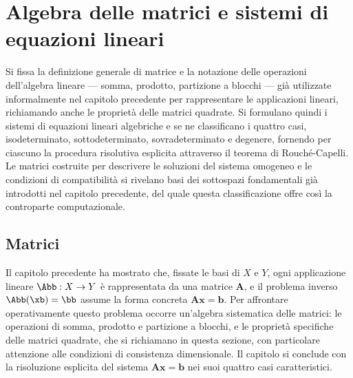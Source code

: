 \graphicspath{{Parti/P01-Preliminari/A02-Algebra_Matrici_Sistemi_Lineari/Figure/}}
\chapter{Algebra delle matrici e  sistemi di equazioni lineari}\label{app:algebra_eqlineari}

\begin{sommario}
	Si fissa la definizione generale di matrice e la notazione delle
	operazioni dell'algebra lineare --- somma, prodotto, partizione a
	blocchi --- gi\`a utilizzate informalmente nel capitolo precedente
	per rappresentare le applicazioni lineari, richiamando anche le
	propriet\`a delle matrici quadrate. Si formulano quindi i sistemi
	di equazioni lineari algebriche  e se ne
	classificano i quattro casi, isodeterminato, sottodeterminato,
	sovradeterminato e degenere, fornendo per ciascuno la procedura
	risolutiva esplicita attraverso il teorema di Rouch\'e-Capelli. Le
	matrici costruite per descrivere le soluzioni del sistema omogeneo
	e le condizioni di compatibilit\`a si rivelano basi dei sottospazi
	fondamentali gi\`a introdotti nel capitolo precedente, del quale
	questa classificazione offre cos\`i la controparte computazionale.
\end{sommario}
%	

\section{Matrici}

Il capitolo precedente ha mostrato che, fissate le basi di $X$ e $Y$, ogni applicazione lineare $\Abb: X \to Y$ è rappresentata da una matrice $\bm{A}$, e il problema inverso $\Abb(\xb)=\bb$ assume la forma concreta $\bm{A}\bm{x}=\bm{b}$. Per affrontare operativamente questo problema occorre un'algebra sistematica delle matrici: le operazioni di somma, prodotto e partizione a blocchi, e le proprietà specifiche delle matrici quadrate, che si richiamano in questa sezione, con particolare attenzione alle condizioni di consistenza dimensionale. Il capitolo si conclude con la risoluzione esplicita del sistema $\bm{A}\bm{x}=\bm{b}$ nei suoi quattro casi caratteristici.


